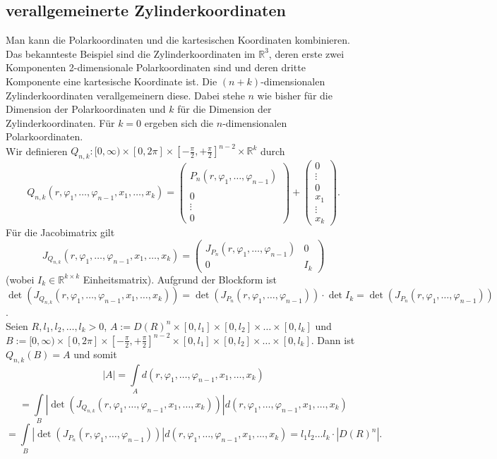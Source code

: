 \documentclass[a4paper,11pt]{scrartcl}
\newcommand{\R}{{\ensuremath{\mathbb{R}}}}
\begin{document}
\subsection{verallgemeinerte Zylinderkoordinaten}
Man kann die Polarkoordinaten und die kartesischen Koordinaten kombinieren. Das bekannteste Beispiel sind die Zylinderkoordinaten im $\R^3$, deren erste zwei Komponenten 2-dimensionale Polarkoordinaten sind und deren dritte Komponente eine kartesische Koordinate ist. Die $(n+k)$-dimensionalen Zylinderkoordinaten verallgemeinern diese. Dabei stehe $n$ wie bisher für die Dimension der Polarkoordinaten und $k$ für die Dimension der Zylinderkoordinaten. Für $k=0$ ergeben sich die $n$-dimensionalen Polarkoordinaten.\\
Wir definieren $Q_{n,k}:[0,\infty)\times[0, 2\pi]\times[-\frac{\pi}{2},+\frac{\pi}{2}]^{n-2}\times \R^k$ durch
$$Q_{n,k}(r,\varphi_1,\ldots,\varphi_{n-1}, x_1, \ldots, x_k)=
\begin{pmatrix} \\ P_n(r,\varphi_1,\ldots,\varphi_{n-1}) \\ \\ 0 \\ \vdots \\ 0 \end{pmatrix}
+ \begin{pmatrix} 0 \\ \vdots \\ 0 \\ x_1 \\ \vdots \\ x_k \end{pmatrix}.$$
Für die Jacobimatrix gilt $$J_{Q_{n,k}}(r,\varphi_1,\ldots,\varphi_{n-1}, x_1, \ldots, x_k)=\begin{pmatrix}
J_{P_n}(r,\varphi_1,\ldots,\varphi_{n-1}) & 0 \\ 0 & I_k
\end{pmatrix}$$
(wobei $I_k\in\R^{k\times k}$ Einheitsmatrix). Aufgrund der Blockform ist \\$\det (J_{Q_{n,k}}(r,\varphi_1,\ldots,\varphi_{n-1}, x_1, \ldots, x_k)) = \det (J_{P_n}(r,\varphi_1,\ldots,\varphi_{n-1}))\cdot \det I_k=\det (J_{P_n}(r,\varphi_1,\ldots,\varphi_{n-1}))$.\\
Seien $R,l_1,l_2,\ldots,l_k>0$, $A:=D(R)^n\times[0,l_1]\times[0,l_2]\times\ldots\times[0,l_k]$ und $B:=[0,\infty)\times[0, 2\pi]\times[-\frac{\pi}{2},+\frac{\pi}{2}]^{n-2}\times[0,l_1]\times[0,l_2]\times\ldots\times[0,l_k]$. Dann ist $Q_{n,k}(B)=A$ und somit
$$|A|=\int\limits_A d(r,\varphi_1,\ldots,\varphi_{n-1}, x_1, \ldots, x_k)$$
$$=\int\limits_B |\det (J_{Q_{n,k}}(r,\varphi_1,\ldots,\varphi_{n-1}, x_1, \ldots, x_k))| d(r,\varphi_1,\ldots,\varphi_{n-1}, x_1, \ldots, x_k)$$
$$ = \int\limits_B |\det (J_{P_n}(r,\varphi_1,\ldots,\varphi_{n-1}))| d(r,\varphi_1,\ldots,\varphi_{n-1}, x_1, \ldots, x_k) = l_1 l_2 \ldots l_k \cdot |D(R)^n|.$$
\end{document}
